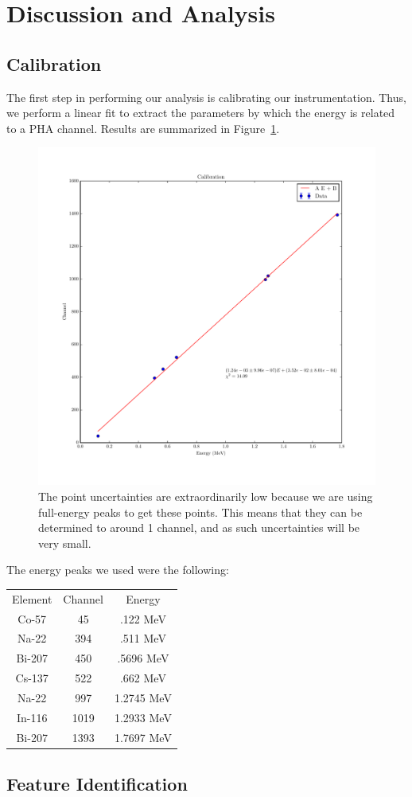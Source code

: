 \documentclass[reprint, nobibnotes, amssymb, amsmath, amsfonts, physics, mathtools, mathrsfs, floatfix]{revtex4-1}
\begin{document}
  \section{Discussion and Analysis}
    \subsection{Calibration}
      The first step in performing our analysis is calibrating our instrumentation.  Thus, we perform a linear fit to extract the parameters by which the energy is related to a PHA channel.  Results are summarized in Figure~\ref{fig:calibration}.

      \begin{figure}[h]
        \centering
        \includegraphics[width=\linewidth]{../plots/calibration.pdf}
        \caption{The point uncertainties are extraordinarily low because we are using full-energy peaks to get these points.  This means that they can be determined to around 1 channel, and as such uncertainties will be very small. \label{fig:calibration}}
      \end{figure}

      The energy peaks we used were the following:

      \begin{tabular}{|c|c|c|}
        Element & Channel & Energy \\
        Co-57 & 45 & .122 MeV \\
        Na-22 & 394 & .511 MeV \\
        Bi-207 & 450 & .5696 MeV \\
        Cs-137 & 522 & .662 MeV \\
        Na-22 & 997 & 1.2745 MeV \\
        In-116 & 1019 & 1.2933 MeV \\
        Bi-207 & 1393 & 1.7697 MeV
      \end{tabular}

    \subsection{Feature Identification}
      




\end{document}
